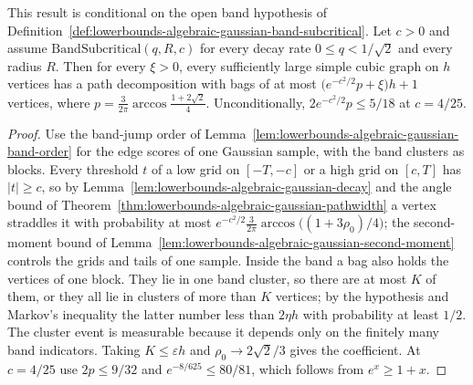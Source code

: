 \begin{theorem}
  \label{thm:lowerbounds-algebraic-gaussian-band-pathwidth}
  \leanok
  This result is conditional on the open band hypothesis of
  Definition~\ref{def:lowerbounds-algebraic-gaussian-band-subcritical}. Let $c>0$ and assume
  $\mathrm{BandSubcritical}(q,R,c)$ for every decay rate $0\le q<1/\sqrt2$ and every radius
  $R$. Then for every $\xi>0$, every sufficiently large simple cubic graph on $h$ vertices has
  a path decomposition with bags of at most $\bigl(e^{-c^2/2}p+\xi\bigr)h+1$ vertices, where
  $p=\tfrac{3}{2\pi}\arccos\tfrac{1+2\sqrt2}{4}$. Unconditionally, $2e^{-c^2/2}p\le5/18$ at
  $c=4/25$.
\end{theorem}
\begin{proof}
  \leanok
  Use the band-jump order of Lemma~\ref{lem:lowerbounds-algebraic-gaussian-band-order} for the
  edge scores of one Gaussian sample, with the band clusters as blocks. Every threshold $t$ of
  a low grid on $[-T,-c]$ or a high grid on $[c,T]$ has $|t|\ge c$, so by
  Lemma~\ref{lem:lowerbounds-algebraic-gaussian-decay} and the angle bound of
  Theorem~\ref{thm:lowerbounds-algebraic-gaussian-pathwidth} a vertex straddles it with
  probability at most $e^{-c^2/2}\tfrac{3}{2\pi}\arccos\bigl((1+3\rho_0)/4\bigr)$; the
  second-moment bound of Lemma~\ref{lem:lowerbounds-algebraic-gaussian-second-moment} controls
  the grids and tails of one sample. Inside the band a bag also holds the vertices of one
  block. They lie in one band cluster, so there are at most $K$ of them, or they all lie in
  clusters of more than $K$ vertices; by the hypothesis and Markov's inequality the latter
  number less than $2\eta h$ with probability at least $1/2$. The cluster event is measurable
  because it depends only on the finitely many band indicators. Taking $K\le\varepsilon h$
  and $\rho_0\to2\sqrt2/3$ gives the coefficient. At $c=4/25$ use $2p\le9/32$ and
  $e^{-8/625}\le80/81$, which follows from $e^{x}\ge1+x$.
\end{proof}

